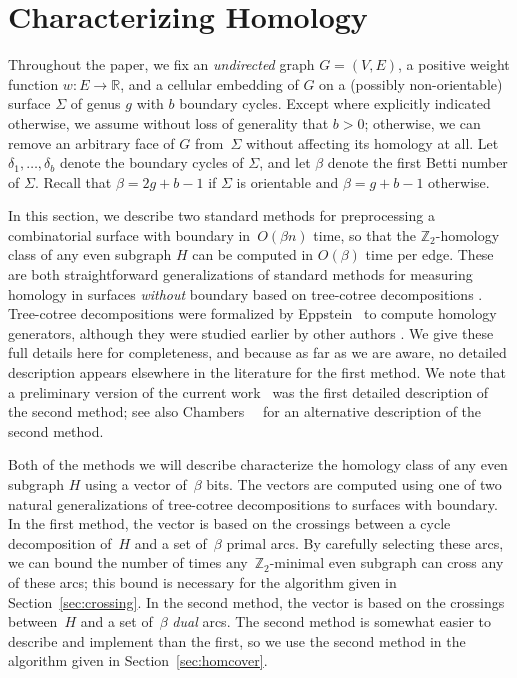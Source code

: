 \documentclass[letterpaper,review]{siamart190516}
\def\Z{\mathbb{Z}}
\def\Real{\mathbb{R}}
\begin{document}
\section{Characterizing Homology}
\label{S:tree-cotree}

Throughout the paper, we fix an \emph{undirected} graph $G=(V,E)$, a positive weight function $w\colon E\to \Real$, and a cellular embedding of $G$ on a (possibly non-orientable) surface $\Sigma$ of genus $g$ with $b$ boundary cycles.
%
Except where explicitly indicated otherwise, we assume without loss of generality that $b>0$; otherwise, we can remove an arbitrary face of $G$ from~$\Sigma$ without affecting its homology at all.  Let $\delta_1, \dots, \delta_b$ denote the boundary cycles of $\Sigma$, and let $\beta$ denote the first Betti number of $\Sigma$.  Recall that $\beta = 2g+b-1$ if $\Sigma$ is orientable and $\beta = g+b-1$ otherwise.

In this section, we describe two standard methods for preprocessing a combinatorial surface with boundary in~$O(\beta n)$ time, so that the $\Z_2$-homology class of any even subgraph $H$ can be computed in $O(\beta)$ time per edge.  These are both straightforward generalizations of standard methods for measuring homology in surfaces \emph{without} boundary based on tree-cotree decompositions \cite{ew-gohhg-05, ccelw-scsih-08, e-dgteg-03}.
Tree-cotree decompositions were formalized by Eppstein~\cite{e-dgteg-03} to compute homology generators, although they were studied earlier by other authors \cite{b-stdg-71, rs-cseg-84, tr-gctts-98}.
We give these full details here for completeness, and because as far as we are aware, no detailed description appears
elsewhere in the literature for the first method.  We note that a preliminary version of the current
work~\cite{en-mcsnc-11} was the first detailed description of the second method;
see also Chambers~\etal~\cite{bcfn-mchbs-17} for an alternative description of the second method.

Both of the methods we will describe characterize the homology class of any even subgraph $H$ using a vector of~$\beta$ bits.
The vectors are computed using one of two natural generalizations of tree-cotree decompositions  to surfaces with boundary.
In the first method, the vector is based on the crossings between a cycle decomposition of~$H$ and a set of~$\beta$ primal arcs.
By carefully selecting these arcs, we can bound the number of times any~$\Z_2$-minimal even subgraph can cross any of these arcs; this bound is necessary for the algorithm given in Section~\ref{sec:crossing}.
In the second method, the vector is based on the crossings between~$H$ and a set of~$\beta$ \emph{dual} arcs.
The second method is somewhat easier to describe and implement than the first, so we use the second method in the algorithm given in Section~\ref{sec:homcover}.
\end{document}
